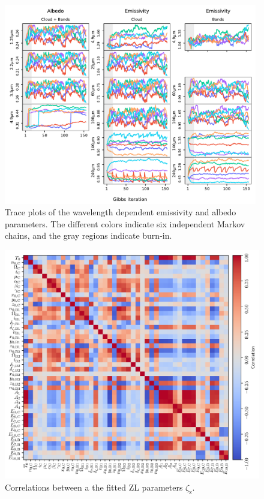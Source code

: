 \documentclass[twocolumn]{aa}
\begin{document}
\begin{figure}
    \centering
    \includegraphics[width=0.985\textwidth]{figs/emissivity_and_albedo_trace.pdf}
    \caption{Trace plots of the wavelength dependent emissivity and albedo parameters. The different colors indicate six independent Markov chains, and the gray regions indicate burn-in.}
    \label{fig:trace-emissivity-albedo}
\end{figure}

\begin{figure}
    \centering
    \includegraphics[width=1\textwidth]{figs/correlation_matrix.pdf}
    \caption{Correlations between a the fitted ZL parameters $\zeta_{\mathrm{z}}$.}
    \label{fig:correlations}
\end{figure}
\end{document}
